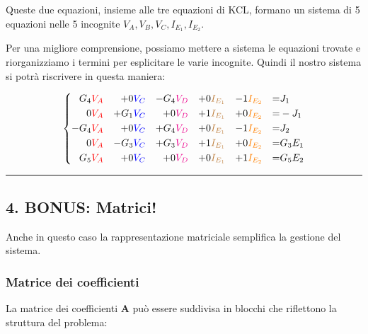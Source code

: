 Queste due equazioni, insieme alle tre equazioni di KCL, formano un sistema di 5 equazioni nelle 5 incognite \(V_A, V_B, V_C, I_{E_1}, I_{E_2}\).


Per una migliore comprensione, possiamo mettere a sistema le equazioni trovate e riorganizziamo i termini per esplicitare le varie incognite.
Quindi il nostro sistema si potrà riscrivere in questa maniera:

\begin{equation}
    \left\{
\begin{aligned}
G_4&\textcolor{red}{V_A} & +0&\textcolor{blue}{V_C} & - G_4&\textcolor{magenta}{V_D} & +0 &\textcolor{brown}{I_{E_1}} & - 1&\textcolor{orange}{I_{E_2}} & = & J_1 \\
0&\textcolor{red}{V_A} & + G_1&\textcolor{blue}{V_C} & +0 &\textcolor{magenta}{V_D} & + 1 &\textcolor{brown}{I_{E_1}} & +0&\textcolor{orange}{I_{E_2}} & = & - J_1 \\
-G_4&\textcolor{red}{V_A} & +0&\textcolor{blue}{V_C} & + G_4&\textcolor{magenta}{V_D} & +0& \textcolor{brown}{I_{E_1}} & - 1&\textcolor{orange}{I_{E_2}} & = & J_2 \\
0&\textcolor{red}{V_A} & - G_3&\textcolor{blue}{V_C} & + G_3&\textcolor{magenta}{V_D} & + 1 &\textcolor{brown}{I_{E_1}} & +0&\textcolor{orange}{I_{E_2}} & = & G_3E_1 \\
G_5&\textcolor{red}{V_A} & +0&\textcolor{blue}{V_C} & +0 &\textcolor{magenta}{V_D} & +0 &\textcolor{brown}{I_{E_1}} & + 1&\textcolor{orange}{I_{E_2}} & = & G_5E_2
\end{aligned}
\right.
\end{equation}



\hrule
\subsection*{4. BONUS: Matrici!}

Anche in questo caso la rappresentazione matriciale semplifica la gestione del sistema.

\subsubsection*{Matrice dei coefficienti}

La matrice dei coefficienti \(\mathbf{A}\) può essere suddivisa in blocchi che riflettono la struttura del problema:

